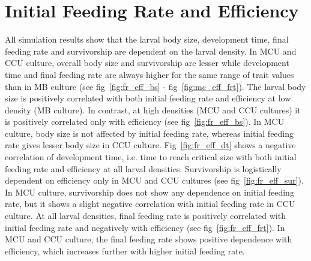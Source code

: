 \section{Initial Feeding Rate and Efficiency}
All simulation results show that the larval body size, development time, final feeding rate and survivorship are dependent on the larval density. In MCU and CCU culture, overall body size and survivorship are lesser while development time and final feeding rate are always higher for the same range of trait values than in MB culture (see fig~\ref{fig:fr_eff_bs} - fig~\ref{fig:mc_eff_frt}). The larval body size is positively correlated with both initial feeding rate and efficiency at low density (MB culture). In contrast, at high densities (MCU and CCU cultures) it is positively correlated only with efficiency (see fig~\ref{fig:fr_eff_bs}). In MCU culture, body size is not affected by initial feeding rate, whereas initial feeding rate gives lesser body size in CCU culture. Fig~\ref{fig:fr_eff_dt} shows a negative correlation of development time, i.e. time to reach critical size with both initial feeding rate and efficiency at all larval densities. Survivorship is logistically dependent on efficiency only in MCU and CCU cultures (see fig~\ref{fig:fr_eff_sur}). In MCU culture, survivorship does not show any dependence on initial feeding rate, but it shows a slight negative correlation with initial feeding rate in CCU culture. At all larval densities, final feeding rate is positively correlated with initial feeding rate and negatively with efficiency (see fig~\ref{fig:fr_eff_frt}). In MCU and CCU culture, the final feeding rate shows positive dependence with efficiency, which increases further with higher initial feeding rate.
